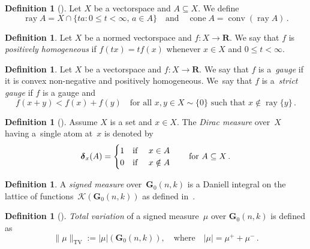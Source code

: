 \documentclass[a4paper,twoside,reqno]{article}
\theoremstyle{definition}
\theoremstyle{remark}
\theoremstyle{plain}
\theoremstyle{remark}
\theoremstyle{definition}
\newtheorem{definition}[theorem]{Definition}
\newcommand{\ccspace}[1]{\mathscr{K}(#1)}
\newcommand{\ograss}[2]{\mathbf{G}_0(#1,#2)}
\newcommand{\R}{\mathbf{R}}
\newcommand{\Dirac}[1]{\boldsymbol{\delta}_{#1}}
\DeclareMathOperator{\conv}{conv}
\DeclareMathOperator{\ray}{ray}
\DeclareMathOperator{\cone}{cone}
\newcommand{\without}{\!\sim\!}
\begin{document}
\begin{definition}[]
    Let $X$ be a vectorspace and $A \subseteq X$. We define
    \[
        \ray A = X \cap \{ ta : 0 \le t < \infty ,\, a \in A \}
        \quad \text{and} \quad
        \cone A = \conv (\ray A) \,.
    \]
\end{definition}

\begin{definition}
    Let $X$ be a normed vectorspace and $f : X \to \R$. We say that $f$ is
    \emph{positively homogeneous} if $f(tx) = t f(x)$ whenever $x \in X$ and
    $0 \le t < \infty$.
\end{definition}

\begin{definition}
    Let $X$ be a vectorspace and $f : X \to \R$. We say that $f$ is
    a~\emph{gauge} if it is convex non-negative and positively homogeneous.
    We~say that $f$ is a~\emph{strict gauge} if $f$ is a gauge and
    \[
        f(x+y) < f(x) + f(y)
        \quad \text{for all $x,y \in X \without \{0\}$ such that $x \notin \ray \{y\}$} \,.
    \]
\end{definition}

\begin{definition}[]
    Assume $X$ is a set and $x \in X$. The \emph{Dirac measure} over~$X$ having a~single
    atom at~$x$ is denoted by
    \[
        \Dirac{x}(A) = 
        \begin{cases}
          1 \text{\quad if \quad} x \in A \\
          0 \text{\quad if \quad} x \notin  A
        \end{cases}
        \quad \text{for $A \subseteq X$} \,.
    \]
\end{definition}

\begin{definition}
    A \emph{signed measure} over~$\ograss nk$ is a Daniell integral on the
    lattice of functions~$\ccspace{\ograss nk}$ as defined
    in~\cite[2.5.6]{Federer1969}.
\end{definition}

\begin{definition}[]
    \emph{Total variation} of a signed measure~$\mu$ over $\ograss nk$ is
    defined as
    \[
        \|\mu\|_{\mathrm{TV}} := |\mu|(\ograss{n}{k}), \quad \text{where} \quad
        |\mu| = \mu^{+}+\mu^{-} \,.
    \]
\end{definition}
\end{document}
